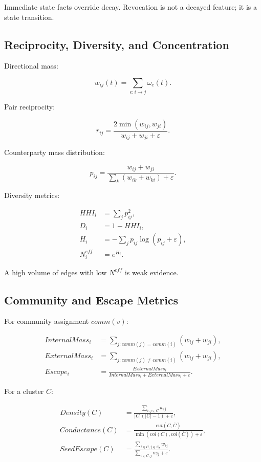 \documentclass[11pt]{article}
\begin{document}
Immediate state facts override decay. Revocation is not a decayed feature; it is a state transition.

\subsection{Reciprocity, Diversity, and Concentration}

Directional mass:

\begin{equation}
w_{ij}(t)=\sum_{e:i\rightarrow j}\omega_e(t).
\end{equation}

Pair reciprocity:

\begin{equation}
r_{ij}=\frac{2\min(w_{ij},w_{ji})}{w_{ij}+w_{ji}+\varepsilon}.
\end{equation}

Counterparty mass distribution:

\begin{equation}
p_{ij}=\frac{w_{ij}+w_{ji}}{\sum_k(w_{ik}+w_{ki})+\varepsilon}.
\end{equation}

Diversity metrics:

\begin{align}
HHI_i &= \sum_jp_{ij}^2,\\
D_i &= 1-HHI_i,\\
H_i &= -\sum_jp_{ij}\log(p_{ij}+\varepsilon),\\
N^{eff}_i &= e^{H_i}.
\end{align}

A high volume of edges with low \(N^{eff}\) is weak evidence.

\subsection{Community and Escape Metrics}

For community assignment \(comm(v)\):

\begin{align}
InternalMass_i &= \sum_{j:comm(j)=comm(i)}(w_{ij}+w_{ji}),\\
ExternalMass_i &= \sum_{j:comm(j)\neq comm(i)}(w_{ij}+w_{ji}),\\
Escape_i &= \frac{ExternalMass_i}{InternalMass_i+ExternalMass_i+\varepsilon}.
\end{align}

For a cluster \(C\):

\begin{align}
Density(C)&=\frac{\sum_{i,j\in C}w_{ij}}{|C|(|C|-1)+\varepsilon},\\
Conductance(C)&=\frac{cut(C,\bar C)}{\min(vol(C),vol(\bar C))+\varepsilon},\\
SeedEscape(C)&=\frac{\sum_{i\in C,j\in S_T}w_{ij}}{\sum_{i\in C,j}w_{ij}+\varepsilon}.
\end{align}
\end{document}
